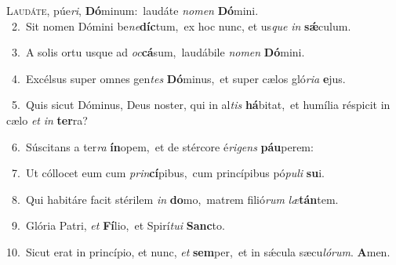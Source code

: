 \lettrine{\initial\textcolor{\initialcolor}{L}}{audáte,} púe\-\textit{ri}\-, \textbf{Dó}\-minum:~\star laudáte \textit{no}\-\textit{men} \textbf{Dó}\-mini.\\
{\numbfont\textcolor{\numbcolor}{~2.}}~Sit nomen Dómini be\-\textit{ne}\-\textbf{díc}tum,~\star ex hoc nunc, et us\textit{que} \textit{in} \textbf{sǽ}\-culum.\par
{\numbfont\textcolor{\numbcolor}{~3.}}~A solis ortu usque ad \textit{oc}\-\textbf{cá}sum,~\star laudábile \textit{no}\-\textit{men} \textbf{Dó}\-mini.\par
{\numbfont\textcolor{\numbcolor}{~4.}}~Excélsus super omnes gen\textit{tes} \textbf{Dó}\-minus,~\star et super cælos gló\-\textit{ri}\-\textit{a} \textbf{e}\-jus.\par
{\numbfont\textcolor{\numbcolor}{~5.}}~Quis sicut Dóminus, Deus noster, qui in al\textit{tis} \textbf{há}\-bitat,~\star et humília réspicit in cælo \textit{et} \textit{in} \textbf{ter}\-ra?\par
{\numbfont\textcolor{\numbcolor}{~6.}}~Súscitans a ter\textit{ra} \textbf{ín}\-opem,~\star et de stércore é\-\textit{ri}\-\textit{gens} \textbf{páu}\-perem:\par
{\numbfont\textcolor{\numbcolor}{~7.}}~Ut cóllocet eum cum \textit{prin}\-\textbf{cí}pibus,~\star cum princípibus pó\-\textit{pu}\-\textit{li} \textbf{su}\-i.\par
{\numbfont\textcolor{\numbcolor}{~8.}}~Qui habitáre facit stérilem \textit{in} \textbf{do}\-mo,~\star matrem filió\textit{rum} \textit{læ}\-\textbf{tán}tem.\par
{\numbfont\textcolor{\numbcolor}{~9.}}~Glória Patri, \textit{et} \textbf{Fí}\-lio,~\star et Spirí\-\textit{tu}\-\textit{i} \textbf{Sanc}\-to.\par
{\numbfont\textcolor{\numbcolor}{10.}}~Sicut erat in princípio, et nunc, \textit{et} \textbf{sem}\-per,~\star et in sǽcula sæcu\-\textit{ló}\-\textit{rum}. \textbf{A}\-men.\par
